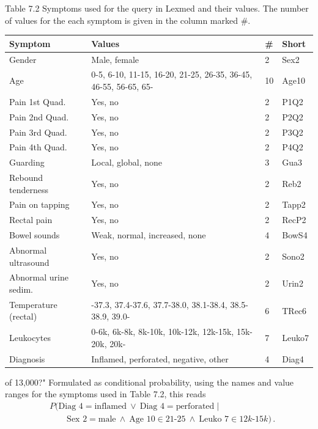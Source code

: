 \documentclass[10pt]{book}
\begin{document}
Table 7.2 Symptoms used for the query in Lexmed and their values. The number of values for the each symptom is given in the column marked \#.
\begin{center}
\begin{tabular}{|l|l|l|l|}
\hline
Symptom & Values & \# & Short \\
\hline
Gender & Male, female & 2 & Sex2 \\
\hline
Age & 0-5, 6-10, 11-15, 16-20, 21-25, 26-35, 36-45, 46-55, 56-65, 65- & 10 & Age10 \\
\hline
Pain 1st Quad. & Yes, no & 2 & P1Q2 \\
\hline
Pain 2nd Quad. & Yes, no & 2 & P2Q2 \\
\hline
Pain 3rd Quad. & Yes, no & 2 & P3Q2 \\
\hline
Pain 4th Quad. & Yes, no & 2 & P4Q2 \\
\hline
Guarding & Local, global, none & 3 & Gua3 \\
\hline
Rebound tenderness & Yes, no & 2 & Reb2 \\
\hline
Pain on tapping & Yes, no & 2 & Tapp2 \\
\hline
Rectal pain & Yes, no & 2 & RecP2 \\
\hline
Bowel sounds & Weak, normal, increased, none & 4 & BowS4 \\
\hline
Abnormal ultrasound & Yes, no & 2 & Sono2 \\
\hline
Abnormal urine sedim. & Yes, no & 2 & Urin2 \\
\hline
Temperature (rectal) & -37.3, 37.4-37.6, 37.7-38.0, 38.1-38.4, 38.5-38.9, 39.0- & 6 & TRec6 \\
\hline
Leukocytes & 0-6k, 6k-8k, 8k-10k, 10k-12k, 12k-15k, 15k-20k, 20k- & 7 & Leuko7 \\
\hline
Diagnosis & Inflamed, perforated, negative, other & 4 & Diag4 \\
\hline
\end{tabular}
\end{center}

of 13,000?" Formulated as conditional probability, using the names and value ranges for the symptoms used in Table 7.2, this reads
\[
\begin{aligned}
& P(\text{Diag }4=\text{inflamed}\ \vee\ \text{Diag }4=\text{perforated}\mid \\
& \qquad \text{Sex }2=\text{male}\ \wedge\ \text{Age }10\in 21\text{-}25\ \wedge\ \text{Leuko }7\in 12k\text{-}15k)\,.
\end{aligned}
\]
\end{document}
